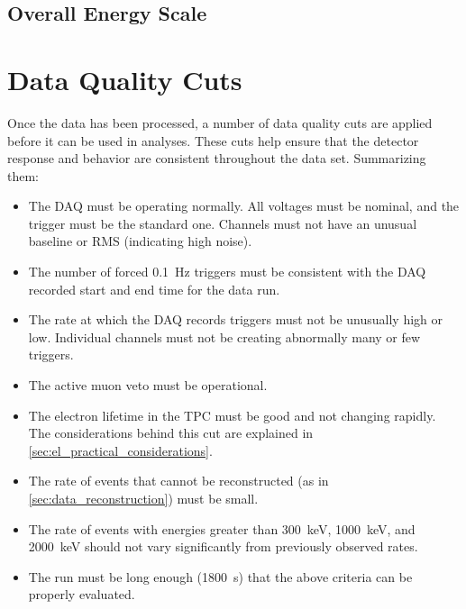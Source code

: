 \documentclass[herrin-thesis.tex]{subfiles}
\begin{document}
\subsection{Overall Energy Scale}



\section{Data Quality Cuts}
Once the data has been processed, a number of data quality cuts are applied before it can be used in analyses. These cuts help ensure that the detector response and behavior are consistent throughout the data set. Summarizing them:
\begin{itemize}
\item The DAQ must be operating normally. All voltages must be nominal, and the trigger must be the standard one. Channels must not have an unusual baseline or RMS (indicating high noise).
\item The number of forced \SI{0.1}{\Hz} triggers must be consistent with the DAQ recorded start and end time for the data run.
\item The rate at which the DAQ records triggers must not be unusually high or low. Individual channels must not be creating abnormally many or few triggers.
\item The active muon veto must be operational.
\item The electron lifetime in the TPC must be good and not changing rapidly. The considerations behind this cut are explained in \cref{sec:el_practical_considerations}.
\item The rate of events that cannot be reconstructed (as in \cref{sec:data_reconstruction}) must be small.
\item The rate of events with energies greater than \SI{300}{\keV}, \SI{1000}{\keV}, and \SI{2000}{\keV} should not vary significantly from previously observed rates.
\item The run must be long enough (\SI{1800}{\s}) that the above criteria can be properly evaluated.
\end{itemize}
\end{document}
